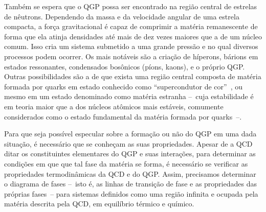 
Também se espera que o QGP possa ser encontrado na região central de estrelas de nêutrons. Dependendo da massa e da velocidade angular de uma estrela compacta, a força gravitacional é capaz de comprimir a matéria remanescente de forma que ela atinja densidades até mais de dez vezes maiores que a de um núcleo comum. Isso cria um sistema submetido a uma grande pressão e no qual diversos processos podem ocorrer. Os mais notáveis são a criação de híperons, bárions em estados ressonantes, condensados bosônicos (píons, kaons), e o próprio QGP. Outras possibilidades são a de que exista uma região central composta de matéria formada por quarks em estado conhecido como ``supercondutor de cor''~\cite{Weber}, ou mesmo em um estado denominado como matéria estranha --~cuja estabilidade é em teoria maior que a dos núcleos atômicos mais estáveis, comumente considerados como o estado fundamental da matéria formada por quarks~--.


Para que seja possível especular sobre a formação ou não do QGP em uma dada situação, é necessário que se conheçam as suas propriedades. Apesar de a QCD ditar os constituintes elementares do QGP e suas interações, para determinar as condições em que que tal fase da matéria se forma, é necessário se verificar as propriedades termodinâmicas da QCD e do QGP. Assim, precisamos determinar o diagrama de fases --~isto é, as linhas de transição de fase e as propriedades das próprias fases~-- para sistemas definidos como uma região infinita e ocupada pela matéria descrita pela QCD, em equilíbrio térmico e químico.

